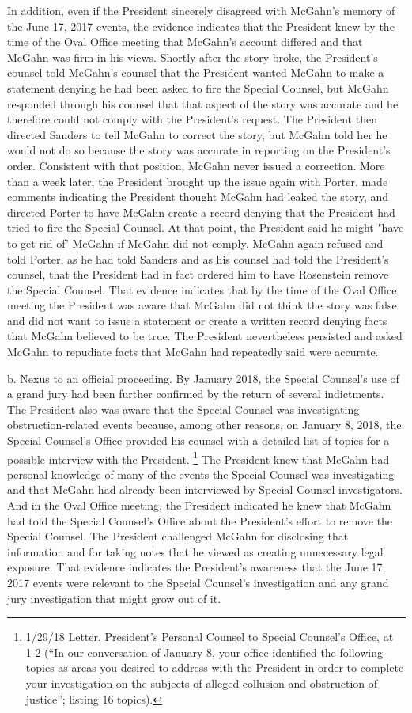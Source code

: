 In addition, even if the President sincerely disagreed with McGahn's memory of the June 17, 2017 events, the evidence indicates that the President knew by the time of the Oval Office
meeting that McGahn's account differed and that McGahn was firm in his views.
Shortly after the story broke, the President's counsel told McGahn's counsel that the President wanted McGahn to make a statement denying he had been asked to fire the Special Counsel, but McGahn responded through his counsel that that aspect of the story was accurate and he therefore could not comply with the President's request.
The President then directed Sanders to tell McGahn to correct the story, but McGahn told her he would not do so because the story was accurate in reporting on the President's order.
Consistent with that position, McGahn never issued a correction.
More than a week later, the President brought up the issue again with Porter, made comments indicating the President thought McGahn had leaked the story, and directed Porter to have McGahn create a record denying that the President had tried to fire the Special Counsel.
At that point, the President said he might "have to get rid of' McGahn if McGahn did not comply.
McGahn again refused and told Porter, as he had told Sanders and as his counsel had told the President's counsel, that the President had in fact ordered him to have Rosenstein remove the Special Counsel.
That evidence indicates that by the time of the Oval Office meeting the President was aware that McGahn did not think the story was false and did not want to issue a statement or create a written record denying facts that McGahn believed to be true.
The President nevertheless persisted and asked McGahn to repudiate facts that McGahn had repeatedly said were accurate.

b. Nexus to an official proceeding.
By January 2018, the Special Counsel's use of a grand jury had been further confirmed by the return of several indictments.
The President also was aware that the Special Counsel was investigating obstruction-related events because, among other reasons, on January 8, 2018, the Special Counsel's Office provided his counsel with a detailed list of topics for a possible interview with the President.%
\footnote{1/29/18 Letter, President’s Personal Counsel to Special Counsel’s Office, at 1-2 (“In our conversation of January 8, your office identified the following topics as areas you desired to address with the President in order to complete your investigation on the subjects of alleged collusion and obstruction of justice”;
listing 16 topics).}
The President knew that McGahn had personal knowledge of many of the events the Special Counsel was investigating and that McGahn had already been interviewed by Special Counsel investigators.
And in the Oval Office meeting, the President indicated he knew that McGahn had told the Special Counsel's Office about the President's effort to remove the Special Counsel.
The President challenged McGahn for disclosing that information and for taking notes that he viewed as creating unnecessary legal exposure.
That evidence indicates the President's awareness that the June 17, 2017 events were relevant to the Special Counsel's investigation and any grand jury investigation that might grow out of it.

